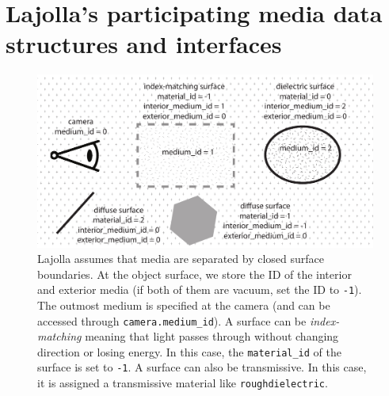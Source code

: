 \section{Lajolla's participating media data structures and interfaces}
\begin{figure}
    \includegraphics[width=\linewidth]{imgs/media.pdf}
    \caption{Lajolla assumes that media are separated by closed surface boundaries. At the object surface, we store the ID of the interior and exterior media (if both of them are vacuum, set the ID to \lstinline{-1}). The outmost medium is specified at the camera (and can be accessed through \lstinline{camera.medium_id}). A surface can be \emph{index-matching} meaning that light passes through without changing direction or losing energy. In this case, the \lstinline{material_id} of the surface is set to \lstinline{-1}. A surface can also be transmissive. In this case, it is assigned a transmissive material like \lstinline{roughdielectric}.}
    \label{fig:data_structure}
\end{figure}

